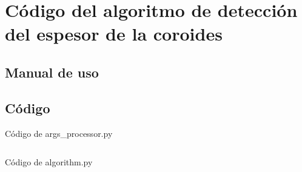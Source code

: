 \chapter{Código del algoritmo de detección del espesor de la coroides}
\section{Manual de uso}

\section{Código}

\begin{codigo_python}
  \caption{Código de args\_processor.py}
  \inputminted[fontsize=\tiny,linenos]{python}{../OpenCV/args_processor.py}
\end{codigo_python}

\begin{codigo_python}
  \caption{Código de algorithm.py}
  \inputminted[fontsize=\tiny,linenos]{python}{../OpenCV/algorithm.py}
\end{codigo_python}